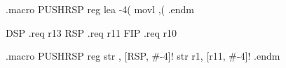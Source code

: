 .macro PUSHRSP reg
lea -4(%
movl \reg,(%
.endm
 
DSP     .req    r13
RSP     .req    r11
FIP     .req    r10

.macro PUSHRSP reg
str     \reg, [RSP, #-4]!
str r1, [r11, #-4]!
.endm


